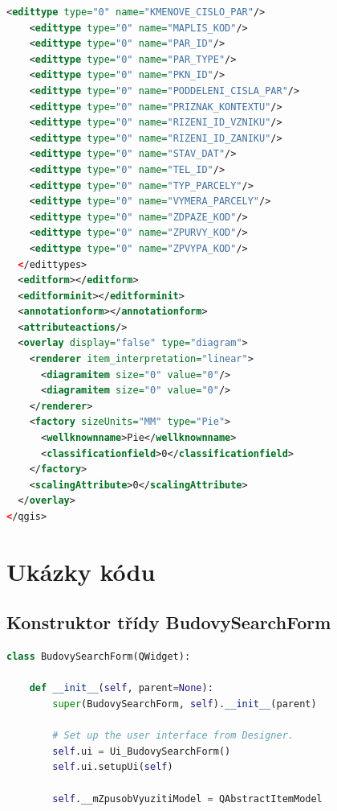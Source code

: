 \documentclass[a4paper,12pt,oneside]{book}
\begin{document}
\begin{lstlisting}[language=XML]
    <edittype type="0" name="KMENOVE_CISLO_PAR"/>
    <edittype type="0" name="MAPLIS_KOD"/>
    <edittype type="0" name="PAR_ID"/>
    <edittype type="0" name="PAR_TYPE"/>
    <edittype type="0" name="PKN_ID"/>
    <edittype type="0" name="PODDELENI_CISLA_PAR"/>
    <edittype type="0" name="PRIZNAK_KONTEXTU"/>
    <edittype type="0" name="RIZENI_ID_VZNIKU"/>
    <edittype type="0" name="RIZENI_ID_ZANIKU"/>
    <edittype type="0" name="STAV_DAT"/>
    <edittype type="0" name="TEL_ID"/>
    <edittype type="0" name="TYP_PARCELY"/>
    <edittype type="0" name="VYMERA_PARCELY"/>
    <edittype type="0" name="ZDPAZE_KOD"/>
    <edittype type="0" name="ZPURVY_KOD"/>
    <edittype type="0" name="ZPVYPA_KOD"/>
  </edittypes>
  <editform></editform>
  <editforminit></editforminit>
  <annotationform></annotationform>
  <attributeactions/>
  <overlay display="false" type="diagram">
    <renderer item_interpretation="linear">
      <diagramitem size="0" value="0"/>
      <diagramitem size="0" value="0"/>
    </renderer>
    <factory sizeUnits="MM" type="Pie">
      <wellknownname>Pie</wellknownname>
      <classificationfield>0</classificationfield>
    </factory>
    <scalingAttribute>0</scalingAttribute>
  </overlay>
</qgis>
\end{lstlisting}

\chapter{Ukázky kódu}

\section{Konstruktor třídy BudovySearchForm}

\begin{lstlisting}[language=Python, 
		    keywordstyle=\color{blue}\ttfamily,
		    stringstyle=\color{red}\ttfamily,
		    commentstyle=\color{green}\ttfamily, morekeywords={qDebug,QString,QgsVectorLayer,QgsMapLayerRegistry,QMessageBox,self},
		    label=l_budovySearchForm_konstruktor]
class BudovySearchForm(QWidget):

    def __init__(self, parent=None):
        super(BudovySearchForm, self).__init__(parent)

        # Set up the user interface from Designer.
        self.ui = Ui_BudovySearchForm()
        self.ui.setupUi(self)

        self.__mZpusobVyuzitiModel = QAbstractItemModel
\end{lstlisting}
\end{document}

